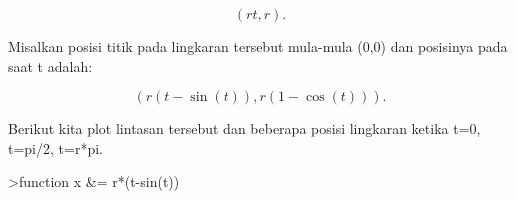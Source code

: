 \documentclass[a4paper,10pt]{article}
\begin{document}
\begin{eulernotebook}
\begin{eulercomment}
\begin{eulercomment}
\begin{eulercomment}
\begin{eulercomment}
\begin{eulercomment}
\end{eulercomment}
\begin{eulerformula}
\[
(rt,r).
\]
\end{eulerformula}
\begin{eulercomment}
Misalkan posisi titik pada lingkaran tersebut mula-mula (0,0) dan
posisinya pada saat t adalah:

\end{eulercomment}
\begin{eulerformula}
\[
(r(t-\sin(t)),r(1-\cos(t))).
\]
\end{eulerformula}
\begin{eulercomment}
Berikut kita plot lintasan tersebut dan beberapa posisi lingkaran
ketika t=0, t=pi/2, t=r*pi.
\end{eulercomment}
\begin{eulerprompt}
>function x &= r*(t-sin(t))
\end{eulerprompt}
\begin{euleroutput}
  

\end{euleroutput}
\end{eulercomment}
\end{eulercomment}
\end{eulercomment}
\end{eulercomment}
\end{eulernotebook}
\end{document}
